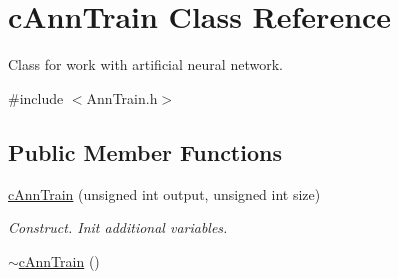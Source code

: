 \hypertarget{classcAnnTrain}{
\section{cAnnTrain Class Reference}
\label{classcAnnTrain}
}


Class for work with artificial neural network.  




{\ttfamily \#include $<$AnnTrain.h$>$}

\subsection*{Public Member Functions}
\begin{DoxyCompactItemize}
\item 
\hyperlink{classcAnnTrain_a5863d11692c47f78e79dd55dfe9c8f3c}{cAnnTrain} (unsigned int output, unsigned int size)
\begin{DoxyCompactList}\small\item\em Construct. Init additional variables. \end{DoxyCompactList}\item 
\hypertarget{classcAnnTrain_ad0eadfbd083a08d25c327b51fefba004}{
\hyperlink{classcAnnTrain_ad0eadfbd083a08d25c327b51fefba004}{$\sim$cAnnTrain} ()}
\label{classcAnnTrain_ad0eadfbd083a08d25c327b51fefba004}


\end{DoxyCompactItemize}
